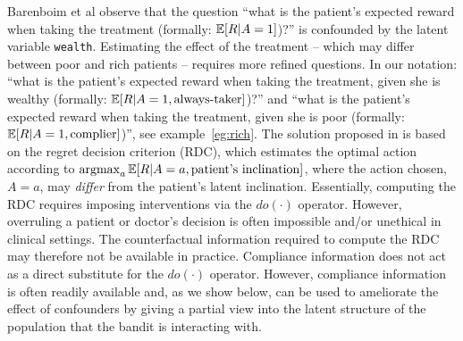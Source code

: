 Barenboim et al observe that the question ``what is the patient's expected reward when taking the treatment (formally: $\operatorname*{\mathbb E}[R|{A=1}]$)?'' is confounded by the latent variable \texttt{wealth}. Estimating the effect of the treatment -- which may differ between poor and rich patients -- requires more refined questions. In our notation: 
``what is the patient's expected reward when taking the treatment, given she is wealthy (formally: $\operatorname*{\mathbb E}[R|{A=1}, \text{always-taker}]$)?'' and  ``what is the patient's expected reward when taking the treatment, given she is poor (formally: $\operatorname*{\mathbb E}[R|{A=1}, \text{complier}]$)'', see example~\ref{eg:rich}.
The solution proposed in \cite{bareinboim:15} is based on the regret decision criterion (RDC), which estimates the optimal action according to $\operatorname*{argmax}_{a}\operatorname*{\mathbb E}[R|A=a,\text{patient's inclination}]$, where the action chosen, $A=a$, may \emph{differ} from the patient's latent inclination. Essentially, computing the RDC requires imposing interventions via the $do(\cdot)$ operator. However, overruling a patient or doctor's decision is often impossible and/or unethical in clinical settings. The counterfactual information required to compute the RDC may therefore not be available in practice.
Compliance information does not act as a direct substitute for the $do(\cdot)$ operator. However, compliance information is often readily available and, as we show below, can be used to ameliorate the effect of confounders by giving a partial view into the latent structure of the population that the bandit is interacting with.





